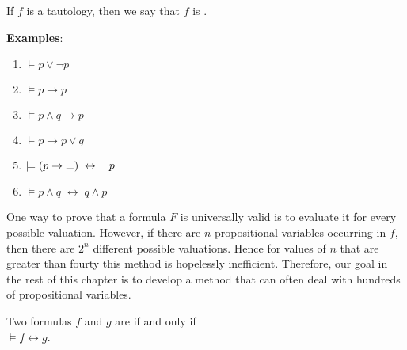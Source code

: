 \noindent
If $f$ is a tautology, then we say that $f$ is  .

\noindent
\textbf{Examples}:
\begin{enumerate}
\item $\models p \vee \neg p$
\item $\models p \rightarrow p$
\item $\models p \wedge q \rightarrow p$
\item $\models p \rightarrow p \vee q$
\item $\models (p \rightarrow \bot) \;\leftrightarrow\; \neg p$
\item $\models p \wedge q \;\leftrightarrow\; q \wedge p$
\end{enumerate}
One way to prove that a formula $F$ is universally valid is to evaluate it for every possible valuation.
However, if there are $n$ propositional variables occurring in $f$, then there are $2^n$ different possible
valuations. 
Hence for values of $n$ that are greater than fourty this method is hopelessly inefficient.  Therefore, our
goal in the rest of this chapter is to develop 
a method that can often deal with hundreds of propositional variables.

\begin{Definition}[Equivalent]
  Two formulas $f$ and $g$ are   if and only if  \\[0.2cm]
  \hspace*{1.3cm} $\models f \leftrightarrow g$.   
  \eox
\end{Definition}

